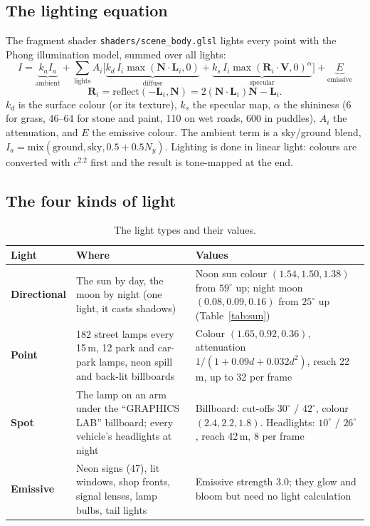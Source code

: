 \documentclass[11pt,a4paper]{article}
\newcommand{\code}[1]{\texttt{\small #1}}
\begin{document}
\subsection{The lighting equation}
The fragment shader \code{shaders/scene\_body.glsl} lights every point with the Phong illumination model, summed over all lights:
\[
I = \underbrace{k_a I_a}_{\text{ambient}} + \sum_{\text{lights}} A_i \Big[\underbrace{k_d\,I_i \max(\mathbf{N}\cdot\mathbf{L}_i, 0)}_{\text{diffuse}} + \underbrace{k_s\,I_i \max(\mathbf{R}_i\cdot\mathbf{V}, 0)^{\alpha}}_{\text{specular}}\Big] + \underbrace{E}_{\text{emissive}}
\]
\[
\mathbf{R}_i = \text{reflect}(-\mathbf{L}_i, \mathbf{N}) = 2(\mathbf{N}\cdot\mathbf{L}_i)\mathbf{N} - \mathbf{L}_i .
\]
$k_d$ is the surface colour (or its texture), $k_s$ the specular map, $\alpha$ the shininess (6 for grass, 46--64 for stone and paint, 110 on wet roads, 600 in puddles), $A_i$ the attenuation, and $E$ the emissive colour. The ambient term is a sky/ground blend, $I_a = \text{mix}(\text{ground}, \text{sky}, 0.5 + 0.5N_y)$. Lighting is done in linear light: colours are converted with $c^{2.2}$ first and the result is tone-mapped at the end.

\subsection{The four kinds of light}

\begin{table}[H]
\centering\small
\begin{tabularx}{\textwidth}{@{}>{\bfseries}l X X@{}}
\toprule
Light & Where & Values \\ \midrule
Directional & The sun by day, the moon by night (one light, it casts shadows) & Noon sun colour $(1.54, 1.50, 1.38)$ from $59^\circ$ up; night moon $(0.08, 0.09, 0.16)$ from $25^\circ$ up (Table~\ref{tab:sun}) \\
Point & 182 street lamps every 15\,m, 12 park and car-park lamps, neon spill and back-lit billboards & Colour $(1.65, 0.92, 0.36)$, attenuation $1/(1 + 0.09d + 0.032d^2)$, reach 22\,m, up to 32 per frame \\
Spot & The lamp on an arm under the ``GRAPHICS LAB'' billboard; every vehicle's headlights at night & Billboard: cut-offs $30^\circ$ / $42^\circ$, colour $(2.4, 2.2, 1.8)$. Headlights: $10^\circ$ / $26^\circ$, reach 42\,m, 8 per frame \\
Emissive & Neon signs (47), lit windows, shop fronts, signal lenses, lamp bulbs, tail lights & Emissive strength 3.0; they glow and bloom but need no light calculation \\
\bottomrule
\end{tabularx}
\caption{The light types and their values.}
\end{table}
\end{document}
